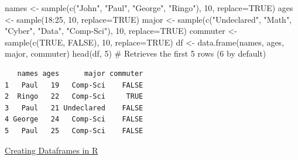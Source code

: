 \documentclass[
  letterpaper,
  DIV=11,
  numbers=noendperiod]{scrreprt}
\newenvironment{Shaded}{\begin{snugshade}}{\end{snugshade}}
\newcommand{\AttributeTok}[1]{\textcolor[rgb]{0.40,0.45,0.13}{#1}}
\newcommand{\CommentTok}[1]{\textcolor[rgb]{0.37,0.37,0.37}{#1}}
\newcommand{\ConstantTok}[1]{\textcolor[rgb]{0.56,0.35,0.01}{#1}}
\newcommand{\DecValTok}[1]{\textcolor[rgb]{0.68,0.00,0.00}{#1}}
\newcommand{\FunctionTok}[1]{\textcolor[rgb]{0.28,0.35,0.67}{#1}}
\newcommand{\NormalTok}[1]{\textcolor[rgb]{0.00,0.23,0.31}{#1}}
\newcommand{\OtherTok}[1]{\textcolor[rgb]{0.00,0.23,0.31}{#1}}
\newcommand{\SpecialCharTok}[1]{\textcolor[rgb]{0.37,0.37,0.37}{#1}}
\newcommand{\StringTok}[1]{\textcolor[rgb]{0.13,0.47,0.30}{#1}}
\begin{document}
\begin{Shaded}
\begin{Highlighting}[]
\NormalTok{names }\OtherTok{\textless{}{-}} \FunctionTok{sample}\NormalTok{(}\FunctionTok{c}\NormalTok{(}\StringTok{"John"}\NormalTok{, }\StringTok{"Paul"}\NormalTok{, }\StringTok{"George"}\NormalTok{, }\StringTok{"Ringo"}\NormalTok{), }\DecValTok{10}\NormalTok{, }\AttributeTok{replace=}\ConstantTok{TRUE}\NormalTok{)}
\NormalTok{ages }\OtherTok{\textless{}{-}} \FunctionTok{sample}\NormalTok{(}\DecValTok{18}\SpecialCharTok{:}\DecValTok{25}\NormalTok{, }\DecValTok{10}\NormalTok{, }\AttributeTok{replace=}\ConstantTok{TRUE}\NormalTok{)}
\NormalTok{major }\OtherTok{\textless{}{-}} \FunctionTok{sample}\NormalTok{(}\FunctionTok{c}\NormalTok{(}\StringTok{"Undeclared"}\NormalTok{, }\StringTok{"Math"}\NormalTok{, }\StringTok{"Cyber"}\NormalTok{, }\StringTok{"Data"}\NormalTok{, }\StringTok{"Comp{-}Sci"}\NormalTok{), }\DecValTok{10}\NormalTok{, }\AttributeTok{replace=}\ConstantTok{TRUE}\NormalTok{)}
\NormalTok{commuter }\OtherTok{\textless{}{-}} \FunctionTok{sample}\NormalTok{(}\FunctionTok{c}\NormalTok{(}\ConstantTok{TRUE}\NormalTok{, }\ConstantTok{FALSE}\NormalTok{), }\DecValTok{10}\NormalTok{, }\AttributeTok{replace=}\ConstantTok{TRUE}\NormalTok{)}
\NormalTok{df }\OtherTok{\textless{}{-}} \FunctionTok{data.frame}\NormalTok{(names, ages, major, commuter)}
\FunctionTok{head}\NormalTok{(df, }\DecValTok{5}\NormalTok{) }\CommentTok{\# Retrieves the first 5 rows (6 by default)}
\end{Highlighting}
\end{Shaded}

\begin{verbatim}
   names ages      major commuter
1   Paul   19   Comp-Sci    FALSE
2  Ringo   22   Comp-Sci     TRUE
3   Paul   21 Undeclared    FALSE
4 George   24   Comp-Sci    FALSE
5   Paul   25   Comp-Sci    FALSE
\end{verbatim}

\begin{watch}{}{}
    \href{https://youtu.be/KjMZt7-YDVQ}{Creating Dataframes in R}
\end{watch}
\end{document}
